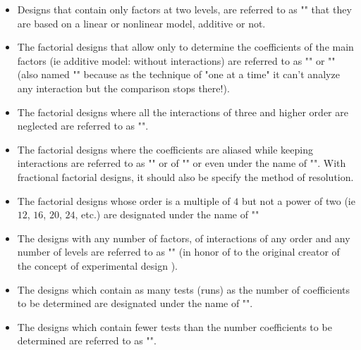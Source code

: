 	\begin{itemize}
		\item Designs that contain only factors at two levels, are referred to as "" that they are based on a linear or nonlinear model, additive or not.

		\item The factorial designs that allow only to determine the coefficients of the main factors (ie additive model: without interactions) are referred to as "" or "" (also named "" because as the technique of "one at a time" it can't analyze any interaction but the comparison stops there!).

		\item The factorial designs where all the interactions of three and higher order are neglected are referred to as "".

		\item The factorial designs where the coefficients are aliased while keeping interactions are referred to as "" or of "" or even under the name of "". With fractional factorial designs, it should also be specify the method of resolution.

		\item The factorial designs whose order is a multiple of $4$ but not a power of two (ie $12$, $16$, $20$, $24$, etc.) are designated under the name of ""

		\item The designs with any number of factors, of interactions of any order and any number of levels are referred to as "" (in honor of to the original creator of the concept of experimental design ).

		\item The designs which contain as many tests (runs) as the number of coefficients to be determined are designated under the name of "".

		\item The designs which contain fewer tests than  the number coefficients to be determined are referred to as "".
	\end{itemize}
